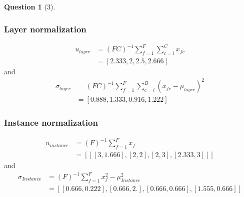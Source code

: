 \documentclass[12pt]{article}
\theoremstyle{definition}
\newtheorem{exercise}{Question}%
\begin{document}
\begin{exercise}[3]
{    \subsubsection*{Layer normalization}
      \begin{align*}
        u_{layer} &= (FC)^{-1} \sum_{f = 1}^{F}  \sum_{c= i}^{C} x_{fc}\\
        &= [2.333, 2, 2.5, 2.666]
      \end{align*} and
      \begin{align*}
        \sigma_{layer} &= (FC)^{-1} \sum_{f = 1}^{F}  \sum_{c= i}^{B}(x_{fc} -\mu_{layer})^{2}\\
        &= [0.888, 1.333, 0.916, 1.222]
      \end{align*}
    \subsubsection*{Instance normalization}
      \begin{align*}
        u_{instance} &= (F)^{-1} \sum_{f = 1}^{F}  x_{f}\\
        &= [[[3        , 1.666],
       [2        , 2        ],
       [2        , 3        ],
       [2.333, 3        ]]]
      \end{align*} and
      \begin{align*}
        \sigma_{Instance} &= (F)^{-1} \sum_{f = 1}^{F}  x_{f}^{2} -\mu_{Instance}^{2}\\
        &= [[0.666, 0.222],
       [0.666, 2.        ],
       [0.666, 0.666],
          [1.555, 0.666]]
      \end{align*}
    }
\end{exercise}
\end{document}
